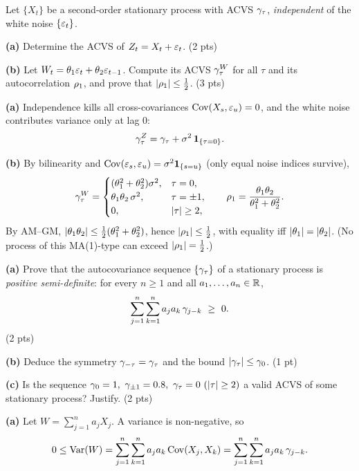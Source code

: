 \documentclass[11pt]{article}
\begin{document}
\statementstart
Let $\{X_t\}$ be a second-order stationary process with ACVS $\gamma_\tau$, \emph{independent} of the white noise $\{\varepsilon_t\}$.

\textbf{(a)} Determine the ACVS of $Z_t = X_t + \varepsilon_t$. \hfill(2 pts)

\textbf{(b)} Let $W_t = \theta_1\varepsilon_t + \theta_2\varepsilon_{t-1}$. Compute its ACVS $\gamma^W_\tau$ for all $\tau$ and its autocorrelation $\rho_1$, and prove that $\left\lvert \rho_1 \right\rvert\le\tfrac12$. \hfill(3 pts)
\statementend

\textbf{(a)} Independence kills all cross-covariances $\operatorname{Cov}(X_s,\varepsilon_u)=0$, and the white noise contributes variance only at lag $0$:
\[
\gamma^Z_\tau=\gamma_\tau+\sigma^2\,\mathbf{1}_{\{\tau=0\}}.
\]

\textbf{(b)} By bilinearity and $\operatorname{Cov}(\varepsilon_s,\varepsilon_u)=\sigma^2\mathbf{1}_{\{s=u\}}$ (only equal noise indices survive),
\[
\gamma^W_\tau=\begin{cases}(\theta_1^2+\theta_2^2)\sigma^2,&\tau=0,\\ \theta_1\theta_2\,\sigma^2,&\tau=\pm1,\\ 0,&\left\lvert \tau \right\rvert\ge2,\end{cases}
\qquad
\rho_1=\frac{\theta_1\theta_2}{\theta_1^2+\theta_2^2}.
\]
By AM--GM, $\left\lvert \theta_1\theta_2 \right\rvert\le\tfrac12(\theta_1^2+\theta_2^2)$, hence $\left\lvert \rho_1 \right\rvert\le\tfrac12$, with equality iff $\left\lvert \theta_1 \right\rvert=\left\lvert \theta_2 \right\rvert$. (No process of this MA(1)-type can exceed $\left\lvert \rho_1 \right\rvert=\tfrac12$.)

\statementstart
\textbf{(a)} Prove that the autocovariance sequence $\{\gamma_\tau\}$ of a stationary process is \emph{positive semi-definite}: for every $n\ge1$ and all $a_1,\dots,a_n\in\mathbb{R}$,
\[
\sum_{j=1}^{n}\sum_{k=1}^{n} a_j a_k\,\gamma_{j-k}\ \ge\ 0 .
\]\hfill(2 pts)

\textbf{(b)} Deduce the symmetry $\gamma_{-\tau}=\gamma_\tau$ and the bound $\left\lvert \gamma_\tau \right\rvert\le\gamma_0$. \hfill(1 pt)

\textbf{(c)} Is the sequence $\acvs_0 = 1,\ \acvs_{\pm1} = 0.8,\ \acvs_\tau = 0\ (\abs\tau\ge2)$ a valid ACVS of some stationary process? Justify. \hfill(2 pts)
\statementend

\textbf{(a)} Let $W=\sum_{j=1}^n a_j X_j$. A variance is non-negative, so
\[
0\le\operatorname{Var}(W)=\sum_{j=1}^n\sum_{k=1}^n a_j a_k\operatorname{Cov}(X_j,X_k)=\sum_{j=1}^n\sum_{k=1}^n a_j a_k\,\gamma_{j-k}.
\]
\end{document}

